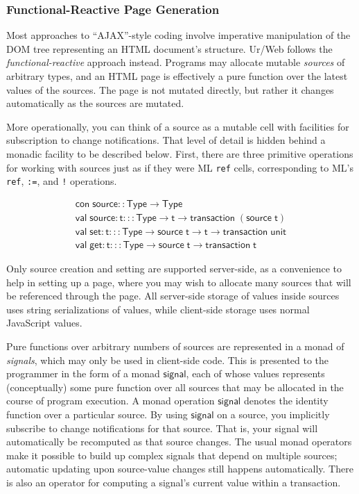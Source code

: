 \documentclass{article}
\newcommand{\cd}[1]{\texttt{#1}}
\newcommand{\mt}[1]{\mathsf{#1}}
\begin{document}
\subsubsection{\label{signals}Functional-Reactive Page Generation}

Most approaches to ``AJAX''-style coding involve imperative manipulation of the DOM tree representing an HTML document's structure.  Ur/Web follows the \emph{functional-reactive} approach instead.  Programs may allocate mutable \emph{sources} of arbitrary types, and an HTML page is effectively a pure function over the latest values of the sources.  The page is not mutated directly, but rather it changes automatically as the sources are mutated.

More operationally, you can think of a source as a mutable cell with facilities for subscription to change notifications.  That level of detail is hidden behind a monadic facility to be described below.  First, there are three primitive operations for working with sources just as if they were ML \cd{ref} cells, corresponding to ML's \cd{ref}, \cd{:=}, and \cd{!} operations.

$$\begin{array}{l}
  \mt{con} \; \mt{source} :: \mt{Type} \to \mt{Type} \\
  \mt{val} \; \mt{source} : \mt{t} ::: \mt{Type} \to \mt{t} \to \mt{transaction} \; (\mt{source} \; \mt{t}) \\
  \mt{val} \; \mt{set} : \mt{t} ::: \mt{Type} \to \mt{source} \; \mt{t} \to \mt{t} \to \mt{transaction} \; \mt{unit} \\
  \mt{val} \; \mt{get} : \mt{t} ::: \mt{Type} \to \mt{source} \; \mt{t} \to \mt{transaction} \; \mt{t}
\end{array}$$

Only source creation and setting are supported server-side, as a convenience to help in setting up a page, where you may wish to allocate many sources that will be referenced through the page.  All server-side storage of values inside sources uses string serializations of values, while client-side storage uses normal JavaScript values.

Pure functions over arbitrary numbers of sources are represented in a monad of \emph{signals}, which may only be used in client-side code.  This is presented to the programmer in the form of a monad $\mt{signal}$, each of whose values represents (conceptually) some pure function over all sources that may be allocated in the course of program execution.  A monad operation $\mt{signal}$ denotes the identity function over a particular source.  By using $\mt{signal}$ on a source, you implicitly subscribe to change notifications for that source.  That is, your signal will automatically be recomputed as that source changes.  The usual monad operators make it possible to build up complex signals that depend on multiple sources; automatic updating upon source-value changes still happens automatically.  There is also an operator for computing a signal's current value within a transaction.
\end{document}
